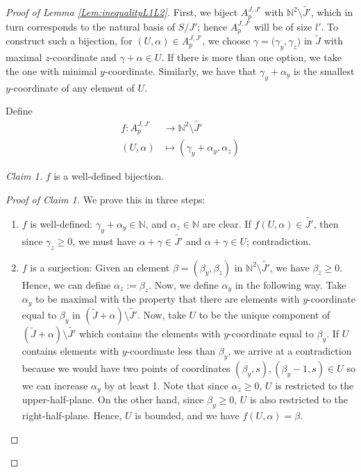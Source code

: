 \documentclass[11pt,a4paper,leqno,noamsfonts]{amsart}
\numberwithin{equation}{section}
\newcommand{\BN}{{\mathbb{N}}}
\theoremstyle{definition}
\theoremstyle{thm}
\theoremstyle{ex}
\theoremstyle{sol}
\begin{document}
\begin{proof}[Proof of Lemma \ref{Lem:inequalityL1L2}]
 
First, we biject $A^{J,J'}_p$ with $\mathbb{N}^2\setminus\tilde{J'}$, which in turn corresponds to the natural basis of $S/J'$; hence $A^{J,J'}_p$ will be of
size $l'$. To construct such a bijection,  for $(U,\alpha)\in A^{J,J'}_p$, we choose  $\gamma={(\gamma_y,\gamma_z})$ in $\tilde{J}$ with maximal $z$-coordinate and $\gamma+\alpha\in U$. If there is more than one option, we take the one with minimal $y$-coordinate. Similarly, we have that $\gamma_y+\alpha_y$ is the smallest $y$-coordinate of any element of $U$.

Define
\begin{align*}
    f:A^{J,J'}_p&\rightarrow \mathbb{N}^2\setminus\tilde{J'}\\
    (U,\alpha)&\mapsto(\gamma_y+\alpha_y,\alpha_z)
\end{align*}




\emph{Claim 1.} $f$ is a well-defined bijection.
\begin{proof}[Proof of Claim 1] We prove this in three steps:


\begin{enumerate}
    \item $f$ is well-defined: $\gamma_y+\alpha_y\in\BN$, and $\alpha_z\in \BN$ are clear. If $f(U,\alpha)\in\tilde{J'}$, then since $\gamma_z\geq0$, we must have $\alpha+\gamma\in\tilde{J'}$ and $\alpha+\gamma\in U$; contradiction.
    


     \item $f$ is a surjection: Given an element $\beta=(\beta_y,\beta_z)$ in $\mathbb{N}^2\setminus\tilde{J'}$, we have $\beta_z\geq 0$. Hence, we can define $\alpha_z:=\beta_z$. Now, we define $\alpha_y$ in the following way. Take $\alpha_y$ to be maximal with the property that there are elements with $y$-coordinate equal to $\beta_y$ in $(\tilde{J}+\alpha)\setminus\tilde{J'}$. Now, take $U$ to be the unique component of $(\tilde{J}+\alpha)\setminus\tilde{J'}$ which contains the elements with  $y$-coordinate equal to $\beta_y$. If $U$ contains elements with $y$-coordinate less than $\beta_y$, we arrive at a contradiction because we would have two points of coordinates $(\beta_y,s),(\beta_y-1,s)\in U$ so we can increase $\alpha_y$ by at least 1. Note that since $\alpha_z\geq 0$, $U$ is restricted to the upper-half-plane. On the other hand, since  $\beta_y\geq 0$, $U$ is also restricted to the right-half-plane. Hence, $U$ is bounded, and we have $f(U,\alpha)=\beta$.


\end{enumerate}
\end{proof}
\end{proof}
\end{document}
